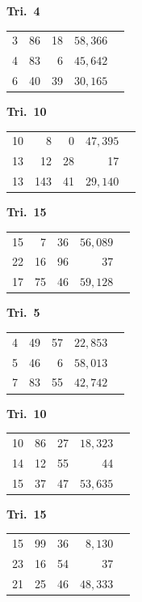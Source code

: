 \documentclass[12pt,a4paper]{article}
\theoremstyle{plain}
\theoremstyle{definition}
\theoremstyle{remark}
\begin{document}
\begin{center}
\medskip
\noindent
\begin{minipage}[t]{0.32\textwidth}
\centering
\textbf{Tri.~4}
\begin{tabular}[t]{r|r|r|r|l}
  3 & 86 & 18 & $58{,}366$ \\
  4 & 83 & 6 & $45{,}642$ \\
  6 & 40 & 39 & $30{,}165$ \\
\end{tabular}
\end{minipage}\hfill
\begin{minipage}[t]{0.32\textwidth}
\centering
\textbf{Tri.~10}
\begin{tabular}[t]{r|r|r|r|l}
  10 & 8 & 0 & $47{,}395$ \\
  13 & 12 & 28 & 17 \\
  13 & 143 & 41 & $29{,}140$ \\
\end{tabular}
\end{minipage}\hfill
\begin{minipage}[t]{0.32\textwidth}
\centering
\textbf{Tri.~15}
\begin{tabular}[t]{r|r|r|r|l}
  15 & 7 & 36 & $56{,}089$ \\
  22 & 16 & 96 & 37 \\
  17 & 75 & 46 & $59{,}128$ \\
\end{tabular}
\end{minipage}

\medskip
\noindent
\begin{minipage}[t]{0.32\textwidth}
\centering
\textbf{Tri.~5}
\begin{tabular}[t]{r|r|r|r|l}
  4 & 49 & 57 & $22{,}853$ \\
  5 & 46 & 6 & $58{,}013$ \\
  7 & 83 & 55 & $42{,}742$ \\
\end{tabular}
\end{minipage}\hfill
\begin{minipage}[t]{0.32\textwidth}
\centering
\textbf{Tri.~10}
\begin{tabular}[t]{r|r|r|r|l}
  10 & 86 & 27 & $18{,}323$ \\
  14 & 12 & 55 & 44 \\
  15 & 37 & 47 & $53{,}635$ \\
\end{tabular}
\end{minipage}\hfill
\begin{minipage}[t]{0.32\textwidth}
\centering
\textbf{Tri.~15}
\begin{tabular}[t]{r|r|r|r|l}
  15 & 99 & 36 & $8{,}130$ \\
  23 & 16 & 54 & 37 \\
  21 & 25 & 46 & $48{,}333$ \\
\end{tabular}
\end{minipage}


\end{center}
\end{document}
